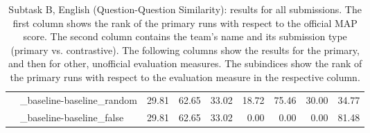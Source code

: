 \begin{table*}[tbh]
\begin{center}
\begin{tabular}{clrrrrrrr}
& \_baseline-baseline\_random & 29.81 & \scriptsize 62.65 & \scriptsize 33.02 & \scriptsize 18.72 & \scriptsize 75.46 & \scriptsize 30.00 & \scriptsize 34.77 \\
& \_baseline-baseline\_false & 29.81 & \scriptsize 62.65 & \scriptsize 33.02 & \scriptsize  0.00 & \scriptsize  0.00 & \scriptsize  0.00 & \scriptsize 81.48 \\
\end{tabular}
\caption{Subtask B, English (Question-Question Similarity): results for all submissions. The first column shows the rank of the primary runs with respect to the official MAP score. The second column contains the team's name and its submission type (primary vs. contrastive).
The following columns show the results for the primary, and then for other, unofficial evaluation measures. The subindices show the rank of the primary runs with respect to the evaluation measure in the respective column.}
\label{table:results}
\end{center}
\end{table*}

